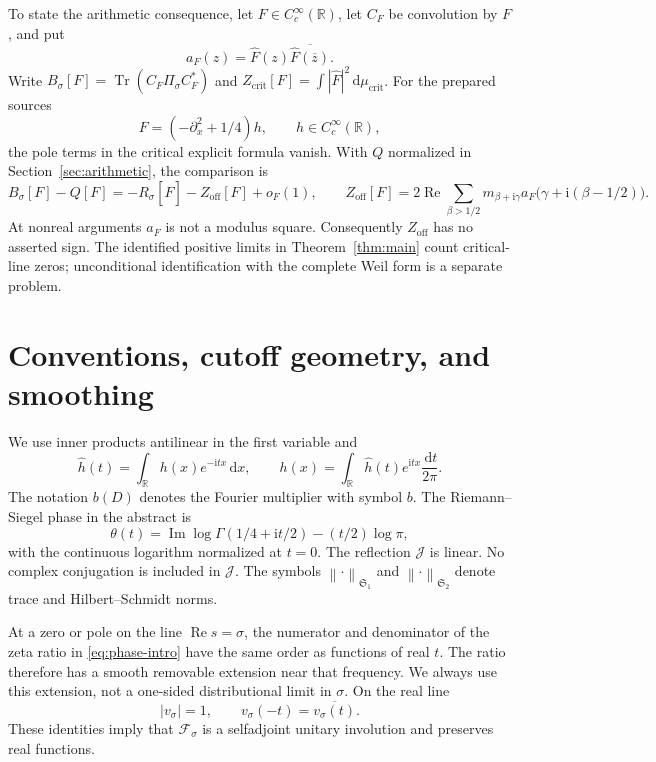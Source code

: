 \documentclass[11pt]{article}
\numberwithin{equation}{section}
\theoremstyle{definition}
\theoremstyle{remark}
\newcommand{\Tr}{\operatorname{Tr}}
\newcommand{\Rea}{\operatorname{Re}}
\newcommand{\Ima}{\operatorname{Im}}
\newcommand{\ii}{\mathrm i}
\newcommand{\J}{\mathcal J}
\newcommand{\Fcal}{\mathcal F}
\newcommand{\Sone}{\mathfrak S_1}
\newcommand{\Stwo}{\mathfrak S_2}
\newcommand{\norm}[1]{\left\lVert #1\right\rVert}
\newcommand{\dd}{\,\mathrm d}
\newcommand{\mucrit}{\mu_{\mathrm{crit}}}
\newcommand{\Zcrit}{Z_{\mathrm{crit}}}
\newcommand{\Zoff}{Z_{\mathrm{off}}}
\begin{document}
To state the arithmetic consequence, let \(F\in C_c^\infty(\mathbb R)\),
let \(C_F\) be convolution by \(F\), and put
\[
a_F(z)=\widehat F(z)\overline{\widehat F(\overline z)}.
\]
Write \(B_\sigma[F]=\Tr(C_F\Pi_\sigma C_F^*)\) and
\(\Zcrit[F]=\int|\widehat F|^2\dd\mucrit\).
For the prepared sources
\begin{equation}\label{eq:prepared}
F=(-\partial_x^2+1/4)h,\qquad h\in C_c^\infty(\mathbb R),
\end{equation}
the pole terms in the critical explicit formula vanish.
With \(Q\) normalized in Section~\ref{sec:arithmetic}, the comparison is
\begin{equation}\label{eq:intro-arithmetic}
B_\sigma[F]-Q[F]
=-R_\sigma[\widehat F]-\Zoff[F]+o_F(1),\qquad
\Zoff[F]=2\Rea\sum_{\beta>1/2}m_{\beta+\ii\gamma}
a_F\bigl(\gamma+\ii(\beta-1/2)\bigr).
\end{equation}
At nonreal arguments \(a_F\) is not a modulus square.
Consequently \(\Zoff\) has no asserted sign. The identified positive limits in
Theorem~\ref{thm:main} count critical-line zeros; unconditional
identification with the complete Weil form is a separate problem.

\section{Conventions, cutoff geometry, and smoothing}\label{sec:setup}

We use inner products antilinear in the first variable and
\begin{equation}\label{eq:fourier}
\widehat h(t)=\int_{\mathbb R}h(x)e^{-\ii tx}\dd x,\qquad
h(x)=\int_{\mathbb R}\widehat h(t)e^{\ii tx}\frac{\dd t}{2\pi}.
\end{equation}
The notation \(b(D)\) denotes the Fourier multiplier with symbol \(b\).
The Riemann--Siegel phase in the abstract is
\[
\theta(t)=\Ima\log\Gamma(1/4+\ii t/2)-(t/2)\log\pi,
\]
with the continuous logarithm normalized at \(t=0\).
The reflection \(\J\) is linear. No complex conjugation is included
in \(\J\). The symbols \(\norm{\cdot}_{\Sone}\) and
\(\norm{\cdot}_{\Stwo}\) denote trace and Hilbert--Schmidt norms.

At a zero or pole on the line \(\Rea s=\sigma\), the numerator and
denominator of the zeta ratio in \eqref{eq:phase-intro} have the same
order as functions of real \(t\). The ratio therefore has a smooth
removable extension near that frequency. We always use this extension,
not a one-sided distributional limit in \(\sigma\).
On the real line
\[
|v_\sigma|=1,\qquad v_\sigma(-t)=\overline{v_\sigma(t)}.
\]
These identities imply that \(\Fcal_\sigma\) is a selfadjoint
unitary involution and preserves real functions.
\end{document}
